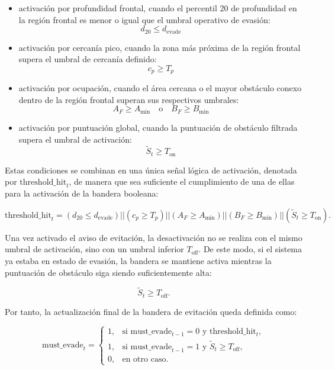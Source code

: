 \begin{itemize}
    \item activación por profundidad frontal, cuando el percentil 20 de profundidad en la región frontal es menor o igual que el umbral operativo de evasión:
    \[d_{20} \le d_{\text{evade}}\]

    \item activación por cercanía pico, cuando la zona más próxima de la región frontal supera el umbral de cercanía definido:
    \[c_p \ge T_p\]

    \item activación por ocupación, cuando el área cercana o el mayor obstáculo conexo dentro de la región frontal superan sus respectivos umbrales:
    \[A_F \ge A_{\min} \quad \text{o} \quad B_F \ge B_{\min}\]

    \item activación por puntuación global, cuando la puntuación de obstáculo filtrada supera el umbral de activación:
    \[\tilde{S}_t \ge T_{\text{on}}\]
\end{itemize}

Estas condiciones se combinan en una única señal lógica de activación, denotada por \(\mathrm{threshold\_hit}_t\), de manera que sea suficiente el cumplimiento de una de ellas
para la activación de la bandera booleana:

\[
\mathrm{threshold\_hit}_t =
(d_{20} \le d_{\text{evade}}) || (c_p \ge T_p) || (A_F \ge A_{\min}) || (B_F \ge B_{\min}) || (\tilde{S}_t \ge T_{\text{on}}). \]

Una vez activado el aviso de evitación, la desactivación no se realiza con el mismo umbral de activación, sino con un umbral inferior \(T_{\text{off}}\). De este modo, si el sistema ya estaba en estado de evasión, la bandera se mantiene activa mientras la puntuación de obstáculo siga siendo suficientemente alta:

\[
\tilde{S}_t \ge T_{\text{off}}.
\]

Por tanto, la actualización final de la bandera de evitación queda definida como:

\[
\mathrm{must\_evade}_t =
\begin{cases}
1, & \text{si } \mathrm{must\_evade}_{t-1}=0 \text{ y } \mathrm{threshold\_hit}_t,\\
1, & \text{si } \mathrm{must\_evade}_{t-1}=1 \text{ y } \tilde{S}_t \ge T_{\text{off}},\\
0, & \text{en otro caso.}
\end{cases}
\]

